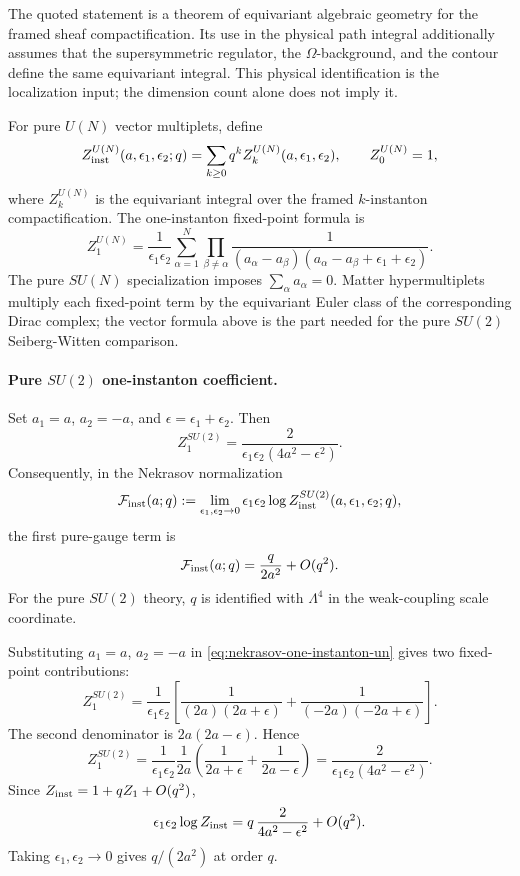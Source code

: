 The quoted statement is a theorem of equivariant algebraic geometry for the
framed sheaf compactification.  Its use in the physical path integral
additionally assumes that the supersymmetric regulator, the
\(\Omega\)-background, and the contour define the same equivariant integral.
This physical identification is the localization input; the dimension count
alone does not imply it.

\begin{definition}
\label{def:pure-vector-nekrasov-partition}
For pure \(U(N)\) vector multiplets, define
\[
  Z_{\rm inst}^{U(N)}(a,\epsilon_1,\epsilon_2;q)
  =
  \sum_{k\geq0}q^k Z_k^{U(N)}(a,\epsilon_1,\epsilon_2),
  \qquad
  Z_0^{U(N)}=1,
\]
where \(Z_k^{U(N)}\) is the equivariant integral over the framed
\(k\)-instanton compactification.  The one-instanton fixed-point formula is
\begin{equation}
  Z_1^{U(N)}
  =
  \frac1{\epsilon_1\epsilon_2}
  \sum_{\alpha=1}^N
  \prod_{\beta\neq\alpha}
  \frac1{(a_\alpha-a_\beta)
  (a_\alpha-a_\beta+\epsilon_1+\epsilon_2)} .
  \label{eq:nekrasov-one-instanton-un}
\end{equation}
The pure \(SU(N)\) specialization imposes \(\sum_\alpha a_\alpha=0\).  Matter
hypermultiplets multiply each fixed-point term by the equivariant Euler class
of the corresponding Dirac complex; the vector formula above is the part
needed for the pure \(SU(2)\) Seiberg-Witten comparison.
\end{definition}

\paragraph{Pure \(SU(2)\) one-instanton coefficient.}
Set \(a_1=a\), \(a_2=-a\), and
\(\epsilon=\epsilon_1+\epsilon_2\).  Then
\[
  Z_1^{SU(2)}
  =
  \frac{2}{\epsilon_1\epsilon_2(4a^2-\epsilon^2)} .
\]
Consequently, in the Nekrasov normalization
\[
  \mathcal F_{\rm inst}(a;q)
  :=
  \lim_{\epsilon_1,\epsilon_2\to0}
  \epsilon_1\epsilon_2
  \log Z_{\rm inst}^{SU(2)}(a,\epsilon_1,\epsilon_2;q),
\]
the first pure-gauge term is
\[
  \mathcal F_{\rm inst}(a;q)
  =
  \frac{q}{2a^2}+O(q^2).
\]
For the pure \(SU(2)\) theory, \(q\) is identified with \(\Lambda^4\) in the
weak-coupling scale coordinate.

Substituting \(a_1=a\), \(a_2=-a\) in
\eqref{eq:nekrasov-one-instanton-un} gives two fixed-point contributions:
\[
  Z_1^{SU(2)}
  =
  \frac1{\epsilon_1\epsilon_2}
  \left[
    \frac1{(2a)(2a+\epsilon)}
    +
    \frac1{(-2a)(-2a+\epsilon)}
  \right].
\]
The second denominator is \(2a(2a-\epsilon)\).  Hence
\[
  Z_1^{SU(2)}
  =
  \frac1{\epsilon_1\epsilon_2}
  \frac1{2a}
  \left(
    \frac1{2a+\epsilon}
    +
    \frac1{2a-\epsilon}
  \right)
  =
  \frac{2}{\epsilon_1\epsilon_2(4a^2-\epsilon^2)} .
\]
Since \(Z_{\rm inst}=1+qZ_1+O(q^2)\),
\[
  \epsilon_1\epsilon_2\log Z_{\rm inst}
  =
  q\,\frac{2}{4a^2-\epsilon^2}
  +O(q^2).
\]
Taking \(\epsilon_1,\epsilon_2\to0\) gives \(q/(2a^2)\) at order \(q\).

